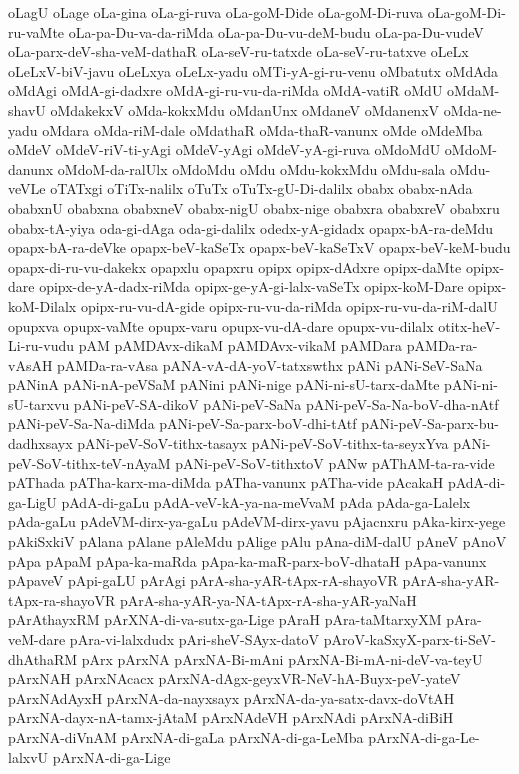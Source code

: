 {oLagU
oLage
oLa-gina
oLa-gi-ruva
oLa-goM-Dide
oLa-goM-Di-ruva
oLa-goM-Di-ru-vaMte
oLa-pa-Du-va-da-riMda
oLa-pa-Du-vu-deM-budu
oLa-pa-Du-vudeV
oLa-parx-deV-sha-veM-dathaR
oLa-seV-ru-tatxde
oLa-seV-ru-tatxve
oLeLx
oLeLxV-biV-javu
oLeLxya
oLeLx-yadu
oMTi-yA-gi-ru-venu
oMbatutx
oMdAda
oMdAgi
oMdA-gi-dadxre
oMdA-gi-ru-vu-da-riMda
oMdA-vatiR
oMdU
oMdaM-shavU
oMdakekxV
oMda-kokxMdu
oMdanUnx
oMdaneV
oMdanenxV
oMda-ne-yadu
oMdara
oMda-riM-dale
oMdathaR
oMda-thaR-vanunx
oMde
oMdeMba
oMdeV
oMdeV-riV-ti-yAgi
oMdeV-yAgi
oMdeV-yA-gi-ruva
oMdoMdU
oMdoM-danunx
oMdoM-da-ralUlx
oMdoMdu
oMdu
oMdu-kokxMdu
oMdu-sala
oMdu-veVLe
oTATxgi
oTiTx-nalilx
oTuTx
oTuTx-gU-Di-dalilx
obabx
obabx-nAda
obabxnU
obabxna
obabxneV
obabx-nigU
obabx-nige
obabxra
obabxreV
obabxru
obabx-tA-yiya
oda-gi-dAga
oda-gi-dalilx
odedx-yA-gidadx
opapx-bA-ra-deMdu
opapx-bA-ra-deVke
opapx-beV-kaSeTx
opapx-beV-kaSeTxV
opapx-beV-keM-budu
opapx-di-ru-vu-dakekx
opapxlu
opapxru
opipx
opipx-dAdxre
opipx-daMte
opipx-dare
opipx-de-yA-dadx-riMda
opipx-ge-yA-gi-lalx-vaSeTx
opipx-koM-Dare
opipx-koM-Dilalx
opipx-ru-vu-dA-gide
opipx-ru-vu-da-riMda
opipx-ru-vu-da-riM-dalU
opupxva
opupx-vaMte
opupx-varu
opupx-vu-dA-dare
opupx-vu-dilalx
otitx-heV-Li-ru-vudu
pAM
pAMDAvx-dikaM
pAMDAvx-vikaM
pAMDara
pAMDa-ra-vAsAH
pAMDa-ra-vAsa
pANA-vA-dA-yoV-tatxswthx
pANi
pANi-SeV-SaNa
pANinA
pANi-nA-peVSaM
pANini
pANi-nige
pANi-ni-sU-tarx-daMte
pANi-ni-sU-tarxvu
pANi-peV-SA-dikoV
pANi-peV-SaNa
pANi-peV-Sa-Na-boV-dha-nAtf
pANi-peV-Sa-Na-diMda
pANi-peV-Sa-parx-boV-dhi-tAtf
pANi-peV-Sa-parx-bu-dadhxsayx
pANi-peV-SoV-tithx-tasayx
pANi-peV-SoV-tithx-ta-seyxYva
pANi-peV-SoV-tithx-teV-nAyaM
pANi-peV-SoV-tithxtoV
pANw
pAThAM-ta-ra-vide
pAThada
pATha-karx-ma-diMda
pATha-vanunx
pATha-vide
pAcakaH
pAdA-di-ga-LigU
pAdA-di-gaLu
pAdA-veV-kA-ya-na-meVvaM
pAda
pAda-ga-Lalelx
pAda-gaLu
pAdeVM-dirx-ya-gaLu
pAdeVM-dirx-yavu
pAjacnxru
pAka-kirx-yege
pAkiSxkiV
pAlana
pAlane
pAleMdu
pAlige
pAlu
pAna-diM-dalU
pAneV
pAnoV
pApa
pApaM
pApa-ka-maRda
pApa-ka-maR-parx-boV-dhataH
pApa-vanunx
pApaveV
pApi-gaLU
pArAgi
pArA-sha-yAR-tApx-rA-shayoVR
pArA-sha-yAR-tApx-ra-shayoVR
pArA-sha-yAR-ya-NA-tApx-rA-sha-yAR-yaNaH
pArAthayxRM
pArXNA-di-va-sutx-ga-Lige
pAraH
pAra-taMtarxyXM
pAra-veM-dare
pAra-vi-lalxdudx
pAri-sheV-SAyx-datoV
pAroV-kaSxyX-parx-ti-SeV-dhAthaRM
pArx
pArxNA
pArxNA-Bi-mAni
pArxNA-Bi-mA-ni-deV-va-teyU
pArxNAH
pArxNAcacx
pArxNA-dAgx-geyxVR-NeV-hA-Buyx-peV-yateV
pArxNAdAyxH
pArxNA-da-nayxsayx
pArxNA-da-ya-satx-davx-doVtAH
pArxNA-dayx-nA-tamx-jAtaM
pArxNAdeVH
pArxNAdi
pArxNA-diBiH
pArxNA-diVnAM
pArxNA-di-gaLa
pArxNA-di-ga-LeMba
pArxNA-di-ga-Le-lalxvU
pArxNA-di-ga-Lige
}
